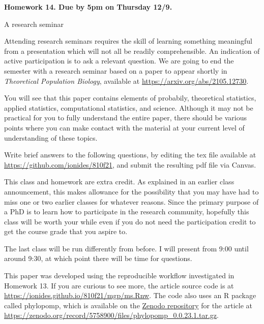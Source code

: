 \documentclass[12pt]{article}
\begin{document}
\begin{center}\bf
Homework 14. Due by 5pm on Thursday 12/9.

A research seminar

\end{center}

Attending research seminars requires the skill of learning something meaningful from a presentation which will not all be readily comprehensible. An indication of active participation is to ask a relevant question. We are going to end the semester with a research seminar based on a paper to appear shortly in {\em Theoretical Population Biology}, available at \url{https://arxiv.org/abs/2105.12730}.

You will see that this paper contains elements of probabily, theoretical statistics, applied statistics, computational statistics, and science.  Although it may not be practical for you to fully understand the entire paper, there should be various points where you can make contact with the material at your current level of understanding of these topics.

Write brief answers to the following questions, by editing the tex file available at \url{https://github.com/ionides/810f21}, and submit the resulting pdf file via Canvas.

This class and homework are extra credit. As explained in an earlier class announcement, this makes allowance for the possibility that you may have had to miss one or two earlier classes for whatever reasons. Since the primary purpose of a PhD is to learn how to participate in the research community, hopefully this class will be worth your while even if you do not need the participation credit to get the course grade that you aspire to.

The last class will be run differently from before. I will present  from 9:00 until around 9:30, at which point there will be time for questions.

This paper was developed using the reproducible workflow investigated in Homework 13. If you are curious to see more, the article source code is at \url{https://ionides.github.io/810f21/mgp/ms.Rnw}. The code also uses an R package called phylopomp, which is  available on the \href{https://zenodo.org/record/5758900}{Zenodo repository} for the article at \url{https://zenodo.org/record/5758900/files/phylopomp_0.0.23.1.tar.gz}.
\end{document}
